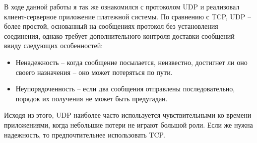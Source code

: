 \documentclass[a4paper,14pt]{article}
\begin{document}
В ходе данной работы я так же ознакомился с протоколом UDP и реализовал клиент-серверное приложение платежной системы. По сравнению с TCP, UDP – более простой, основанный на сообщениях протокол без установления соединения, однако требует дополнительного контроля доставки сообщений ввиду следующих особенностей:
\begin{itemize}
	\item Ненадежность – когда сообщение посылается, неизвестно, достигнет ли оно своего назначения – оно может потеряться по пути.
	\item Неупорядоченность – если два сообщения отправлены последовательно, порядок их получения не может быть предугадан.
\end{itemize} 

Исходя из этого, UDP наиболее часто используется чувствительными ко времени приложениями, когда  небольшие потери не играют большой роли. Если же нужна надежность, то предпочтительнее использовать TCP.
\end{document}
